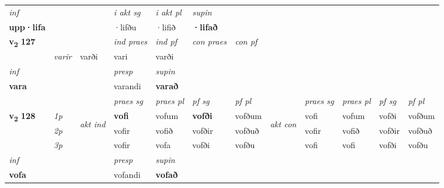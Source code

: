 \begin{longtable}[l]{X>{\footnotesize\itshape}llXXXXlXXXX}
   {\textit{inf}} & &  & \textit{i akt sg} & \textit{i akt pl}    & \textit{supin}   \\*
  {\textbf{upp\allowbreak ·lifa}} & && ·lifðu  & ·lifið    &  \textbf{·lifað}   \\*

\midrule

\multirow{2}{*}{{{\textbf{v{\textsubscript{2}}} \Large{\textbf{127}}}}}  &&&  \textit{ind praes} & \textit{ind pf} & \textit{con praes} & \textit{con pf} \\*
\multicolumn{3}{r}{\textit{e-n}} & varir & varði & vari & varði \\*

\cmidrule{4-7}
   {\textit{inf}} & &     & \textit{presp} & \textit{supin}   \\*
  {\textbf{vara}} & &     & varandi &  \textbf{varað}   \\*

\midrule

 & &   & \textit{praes sg}  & \textit{praes pl}    & \textit{ pf sg} & \textit{pf pl} & & \textit{praes sg}  & \textit{praes pl}    & \textit{pf sg} & \textit{pf pl }  \\ \cmidrule{4-7} \cmidrule{9-12}
 \multirow{2}{*}{{{\textbf{v{\textsubscript{2}}} \Large{\textbf{128}}}}}  & 1p & \multirow{3}{*}{\begin{turn}{90}\textit{akt ind}\end{turn}} & \textbf{vofi} & vofum & \textbf{vofði} & vofðum & \multirow{3}{*}{\begin{turn}{90}\textit{akt con}\end{turn}} &vofi & vofum & vofði & vofðum\\*
 & 2p &  &  vofir  & vofið & vofðir & vofðuð & & vofir & vofið & vofðir & vofðuð \\*
 & 3p &  & vofir & vofa & vofði & vofðu & & vofi & vofi& vofði & vofðu \\*
\cmidrule{4-7} \cmidrule{9-12}

   {\textit{inf}} & &     & \textit{presp} & \textit{supin}   \\*
  {\textbf{vofa}} & &     & vofandi &  \textbf{vofað}   \\*

\midrule


\end{longtable}
